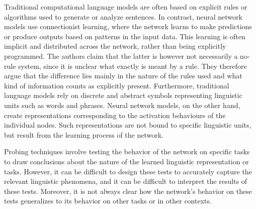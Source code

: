 \documentclass[10pt]{article}
\newenvironment{AnswerBox}{\begin{mdframed}[style=simple]}{\end{mdframed}}
\begin{document}
\begin{AnswerBox}%

  Traditional computational language models are often based on explicit rules or algorithms used to generate or analyze sentences. In contrast, neural network models use connectionist learning, where the network learns to make predictions or produce outputs based on patterns in the input data. This learning is often implicit and distributed across the network, rather than being explicitly programmed. The authors claim that the latter is however not necessarily a no-rule system, since it is unclear what exactly is meant by a rule. They therefore argue that the difference lies mainly in the nature of the rules used and what kind of information counts as explicitly present. Furthermore, traditional language models rely on discrete and abstract symbols representing linguistic units such as words and phrases. Neural network models, on the other hand, create representations corresponding to the activation behaviours of the individual nodes. Such representations are not bound to specific linguistic units, but result from the learning process of the network. 
  
  Probing techniques involve testing the behavior of the network on specific tasks to draw conclusions about the nature of the learned linguistic representation or tasks. However, it can be difficult to design these tests to accurately capture the relevant linguistic phenomena, and it can be difficult to interpret the results of these tests. Moreover, it is not always clear how the network's behavior on these tests generalizes to its behavior on other tasks or in other contexts.

\end{AnswerBox}%
\end{document}
